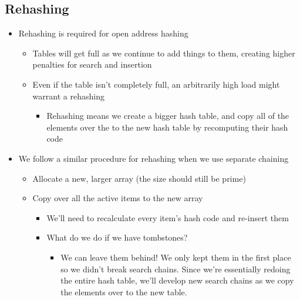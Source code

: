 \documentclass[
  10pt,
  english,
  letterpaper,
,tablecaptionabove
]{scrartcl}
\providecommand{\tightlist}{%
  \setlength{\itemsep}{0pt}\setlength{\parskip}{0pt}}
\begin{document}
\hypertarget{rehashing}{%
\subsection{Rehashing}\label{rehashing}}

\begin{itemize}
\tightlist
\item
  Rehashing is required for open address hashing

  \begin{itemize}
  \tightlist
  \item
    Tables will get full as we continue to add things to them, creating
    higher penalties for search and insertion
  \item
    Even if the table isn't completely full, an arbitrarily high load
    might warrant a rehashing

    \begin{itemize}
    \tightlist
    \item
      Rehashing means we create a bigger hash table, and copy all of the
      elements over the to the new hash table by recomputing their hash
      code
    \end{itemize}
  \end{itemize}
\item
  We follow a similar procedure for rehashing when we use separate
  chaining

  \begin{itemize}
  \tightlist
  \item
    Allocate a new, larger array (the size should still be prime)
  \item
    Copy over all the active items to the new array

    \begin{itemize}
    \tightlist
    \item
      We'll need to recalculate every item's hash code and re-insert
      them
    \item
      What do we do if we have tombstones?

      \begin{itemize}
      \tightlist
      \item
        We can leave them behind! We only kept them in the first place
        so we didn't break search chains. Since we're essentially
        redoing the entire hash table, we'll develop new search chains
        as we copy the elements over to the new table.
      \end{itemize}
    \end{itemize}
  \end{itemize}
\end{itemize}
\end{document}
